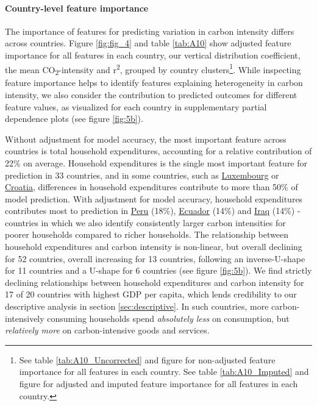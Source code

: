 \documentclass[12pt, a4paper]{article}
\begin{document}
\paragraph{Country-level feature importance}
The importance of features for predicting variation in carbon intensity differs across countries. Figure \ref{fig:fig_4} and table \ref{tab:A10} show adjusted feature importance for all features in each country, our vertical distribution coefficient, the mean CO\textsubscript{2}-intensity and r\textsuperscript{2}, grouped by country clusters\footnote{See table \ref{tab:A10_Uncorrected} and figure  for non-adjusted feature importance for all features in each country. See table \ref{tab:A10_Imputed} and figure  for adjusted and imputed feature importance for all features in each country.}. While inspecting feature importance helps to identify features explaining heterogeneity in carbon intensity, we also consider the contribution to predicted outcomes for different feature values, as visualized for each country in supplementary partial dependence plots (see figure \ref{fig:5b}).

Without adjustment for model accuracy, the most important feature across countries is total household expenditures, accounting for a relative contribution of 22\% on average. Household expenditures is the single most important feature for prediction in 33 countries, and in some countries, such as \hyperref[fig:5b_LUX]{Luxembourg} or \hyperref[fig:5b_HRV]{Croatia}, differences in household expenditures contribute to more than 50\% of model prediction. With adjustment for model accuracy, household expenditures contributes most to prediction in \hyperref[fig:5b_PER]{Peru} (18\%), \hyperref[fig:5b_ECU]{Ecuador} (14\%) and \hyperref[fig:5b_IRQ]{Iraq} (14\%) - countries in which we also identify consistently larger carbon intensities for poorer households compared to richer households. The relationship between household expenditures and carbon intensity is non-linear, but overall declining for 52 countries, overall increasing for 13 countries, following an inverse-U-shape for 11 countries and a U-shape for 6 countries (see figure \ref{fig:5b}). We find strictly declining relationships between household expenditures and carbon intensity for 17 of 20 countries with highest GDP per capita, which lends credibility to our descriptive analysis in section \ref{sec:descriptive}. In such countries, more carbon-intensively consuming households spend \textit{absolutely less} on consumption, but \textit{relatively more} on carbon-intensive goods and services.
\end{document}
